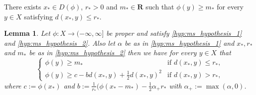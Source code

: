 \documentclass[a4paper,11pt, leqno]{scrreprt} %
\makeatletter
\renewcommand{\leq}{\leqslant}
\renewcommand{\leq}{\leqslant}
\renewcommand{\geq}{\geqslant}
\newcommand{\R}{\mathbf R}
\theoremstyle{change}
\newcounter{acounter}[chapter]
\newtheorem{lemma}[acounter]{Lemma}
\theoremstyle{nonumberplain}
\newenvironment{optional}[1][Hypothesis]{
  \par\noindent \text{[#1]}
  \def\@currentlabel{[#1]}
}{\par\noindent\ignorespacesafterend}
\makeatother
\begin{document}
\begin{optional}[$H_2$]\label{hyp:ms_hypothesis_2}
There exists $x_* \in D(\phi)$, $r_* > 0$ and $m_* \in \R$ such that
$\phi(y) \geq m_*$ for every $y \in X$ satisfying $d(x_*, y) \leq
r_*$.
\end{optional}

\begin{lemma}
  Let $\phi: X \to (-\infty, \infty]$ be proper and satisfy
  \ref{hyp:ms_hypothesis_1} and \ref{hyp:ms_hypothesis_2}. Also let $\alpha$ be as in \ref{hyp:ms_hypothesis_1} and $x_*, r_*$ and $m_*$ be as in \ref{hyp:ms_hypothesis_2}
  then we have for every $y \in X$ that
  \begin{equation}
    \label{eq:ms_lemma1}
    \begin{cases}
      \phi(y) \geq m_* & \text{if $d(x_*, y) \leq r_*$,}\\
      \phi(y) \geq c - b d(x_*, y) + \frac12 d(x_*, y)^2 &\text{if
        $d(x_*, y) > r_*$,}
    \end{cases}
  \end{equation}
  where $c := \phi(x_*)$ and $b := \frac1{r_*} (\phi(x_* - m_*) -
  \frac12 \alpha_+ r_*$ with $\alpha_+ := \max(\alpha, 0)$.
\end{lemma}
\end{document}
